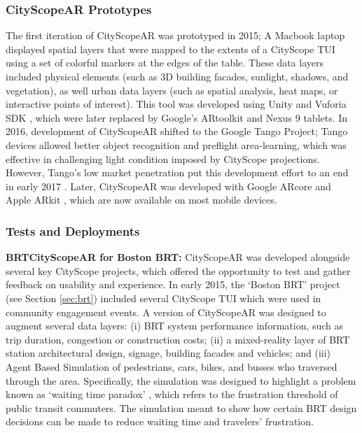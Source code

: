 {{      \subsubsection{CityScopeAR Prototypes}
      {
          The first iteration of CityScopeAR was prototyped in 2015; A Macbook laptop displayed spatial layers that were mapped to the extents of a CityScope TUI using a set of colorful markers at the edges of the table. These data layers included physical elements (such as 3D building facades, sunlight, shadows, and vegetation), as well urban data layers (such as spatial analysis, heat maps, or interactive points of interest). This tool was developed using Unity and Vuforia SDK \cite{UnityRea35:online}, which were later replaced by Google's ARtoolkit and Nexus 9 tablets. In 2016, development of CityScopeAR shifted to the Google Tango Project; Tango devices allowed better object recognition and preflight area-learning, which was effective in challenging light condition imposed by CityScope projections. However, Tango's low market penetration put this development effort to an end in early 2017 \cite{kastrenakes2017google}. Later, CityScopeAR was developed with Google ARcore and Apple ARkit \cite{oufqir2020arkit}, which are now available on most mobile devices.
      }

      \subsubsection{Tests and Deployments}
      {
          \textbf{BRTCityScopeAR for Boston BRT:} CityScopeAR was developed alongside several key CityScope projects, which offered the opportunity to test and gather feedback on usability and experience. In early 2015, the `Boston BRT' project (see Section \eqref{sec:brt}) included several CityScope TUI which were used in community engagement events. A version of CityScopeAR was designed to augment several data layers: (i) BRT system performance information, such as trip duration, congestion or construction costs; (ii) a mixed-reality layer of BRT station architectural design, signage, building facades and vehicles; and (iii) Agent Based Simulation of pedestrians, cars, bikes, and busses who traversed through the area. Specifically, the simulation was designed to highlight a problem known as `waiting time paradox' \cite{avineri2004cumulative}, which refers to the frustration threshold of public transit commuters. The simulation meant to show how certain BRT design decisions can be made to reduce waiting time and travelers' frustration.


}}}
